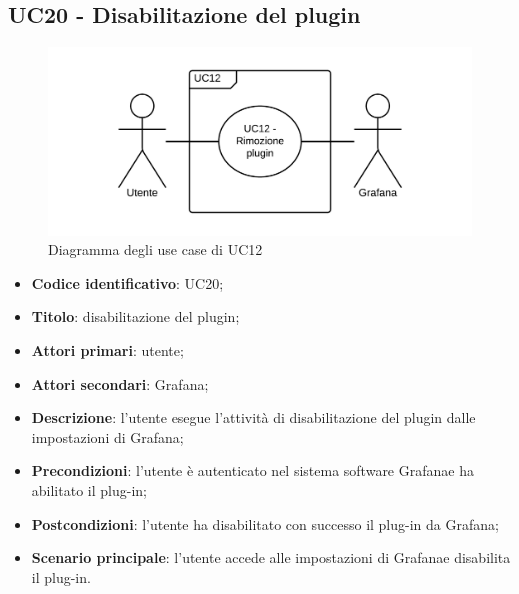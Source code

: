 \subsection{UC20 - Disabilitazione del plugin}
\begin{figure}[H]
	\includegraphics{img/UC12_-_Rimozione_plugin.png}
	\caption{Diagramma degli use case di UC12}
\end{figure}
\begin{itemize}
	\item \textbf{Codice identificativo}: UC20;
	\item \textbf{Titolo}: disabilitazione del plugin;
	\item \textbf{Attori primari}: utente;
	\item \textbf{Attori secondari}: Grafana\glo;
	\item \textbf{Descrizione}: l'utente esegue l'attività di disabilitazione del plugin dalle impostazioni di Grafana\glo;
	\item \textbf{Precondizioni}: l'utente è autenticato nel sistema software Grafana\glosp e ha abilitato il plug-in;
	\item \textbf{Postcondizioni}: l'utente ha disabilitato con successo il plug-in da Grafana\glo;
	\item \textbf{Scenario principale}: l'utente accede alle impostazioni di Grafana\glosp e disabilita il plug-in.
\end{itemize}